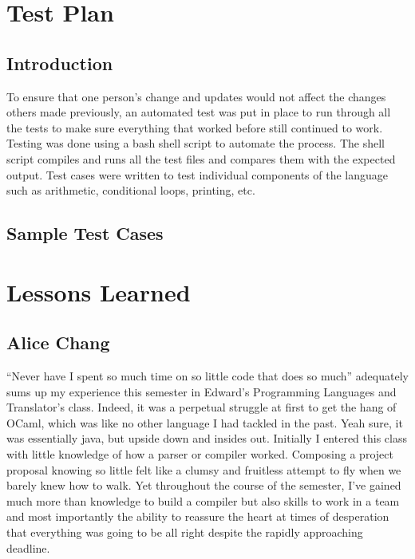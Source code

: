 \documentclass[11pt]{report}
\begin{document}
\chapter{Test Plan}
\section{Introduction}
To ensure that one person's change and updates would not affect the changes others made previously, an automated test was put in place to run through all the tests to make sure everything that worked before still continued to work. Testing was done using a bash shell script to automate the process. The shell script compiles and runs all the test files and compares them with the expected output. Test cases were written to test individual components of the language such as arithmetic, conditional loops, printing, etc.

\section{Sample Test Cases}










\chapter{Lessons Learned}
\section{Alice Chang}
``Never have I spent so much time on so little code that does so much'' adequately sums up my experience this semester in Edward’s Programming Languages and Translator’s class. Indeed, it was a perpetual struggle at first to get the hang of OCaml, which was like no other language I had tackled in the past. Yeah sure, it was essentially java, but upside down and insides out. Initially I entered this class with little knowledge of how a parser or compiler worked. Composing a project proposal knowing so little felt like a clumsy and fruitless attempt to fly when we barely knew how to walk. Yet throughout the course of the semester, I’ve gained much more than knowledge to build a compiler but also skills to work in a team and most importantly the ability to reassure the heart at times of desperation that everything was going to be all right despite the rapidly approaching deadline.
\end{document}
